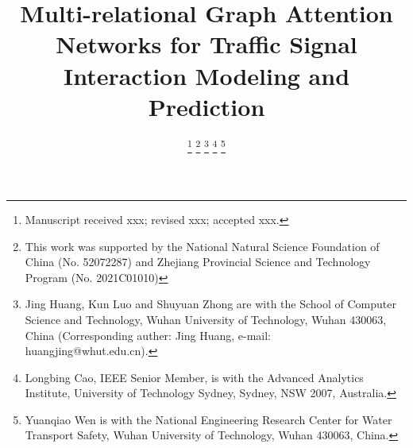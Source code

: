 \documentclass[journal]{IEEEtran}
\begin{document}
\title{Multi-relational Graph Attention Networks for Traffic Signal Interaction Modeling and Prediction}

\author{
    \thanks{Manuscript received xxx; revised xxx; accepted xxx.}
    \thanks{This work was supported by the National Natural Science Foundation of China (No. 52072287) and Zhejiang  Provincial  Science  and  Technology  Program (No. 2021C01010)}
    \thanks{Jing Huang, Kun Luo and Shuyuan Zhong are with the School of Computer Science and Technology, Wuhan University of Technology, Wuhan 430063, China (Corresponding auther: Jing Huang, e-mail: huangjing@whut.edu.cn).}
    \thanks{Longbing Cao, IEEE Senior Member, is with the Advanced Analytics Institute, University of Technology Sydney, Sydney, NSW 2007, Australia.}
    \thanks{Yuanqiao Wen is with the National Engineering Research Center for Water Transport Safety, Wuhan University of Technology, Wuhan 430063, China.}
}
\end{document}
